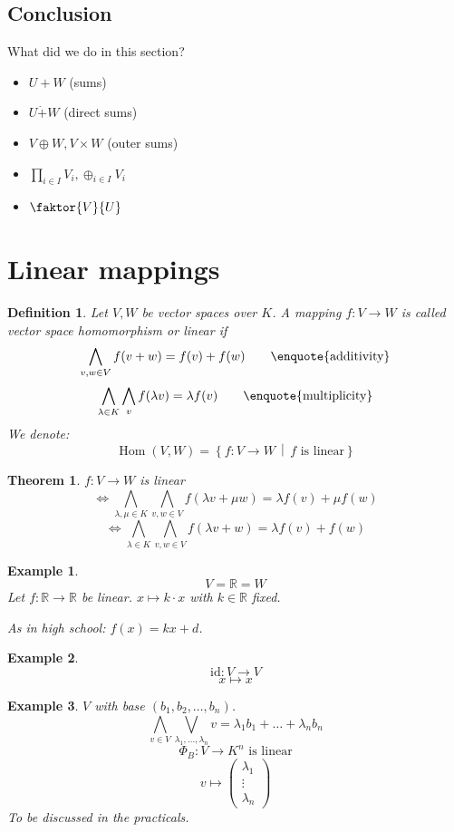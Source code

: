 \documentclass[a4paper,landscape,twocolumn]{article}
\newcommand\setdef[2]{\left\{#1\,\middle|\,#2\right\}}
\newtheorem{theorem}{Theorem}[section]
\newtheorem{defi}{Definition}[section]
\newtheorem{ex}{Example}[section]
\DeclareMathOperator\Hom{Hom} %
\begin{document}
\subsection{Conclusion}

What did we do in this section?
\begin{itemize}
  \item $U+W$ (sums)
  \item $U\dot{+}W$ (direct sums)
  \item $V\oplus W, V \times W$ (outer sums)
  \item $\prod_{i \in I} V_i, \oplus_{i \in I} V_i$
  \item $\faktor{V}{U}$
\end{itemize}

\section{Linear mappings}
\begin{defi}
  Let $V, W$ be vector spaces over $K$.
  A mapping $f: V \rightarrow W$ is called \emph{vector space homomorphism}
  or \emph{linear} if
  \[ \bigwedge_{v,w\in V} f(v+w) = f(v) + f(w) \qquad \text{\enquote{additivity}} \]
  \[ \bigwedge_{\lambda \in K} \bigwedge_{v} f(\lambda v) = \lambda f(v)  \qquad \text{\enquote{multiplicity}} \]
  We denote:
  \[ \Hom(V, W) = \setdef{f: V \rightarrow W}{f \text{ is linear}} \]
\end{defi}

\begin{theorem}
  \label{satz-5-2}
  $f: V \rightarrow W$ is linear
  \[ \iff \bigwedge_{\lambda,\mu \in K} \bigwedge_{v,w \in V} f(\lambda v + \mu w) = \lambda f(v) + \mu f(w) \]
  \[ \iff \bigwedge_{\lambda \in K} \bigwedge_{v,w \in V} f(\lambda v + w) = \lambda f(v) + f(w) \]
\end{theorem}

\begin{ex}
  \label{bsp-5-3}
  \[ V = \mathbb R = W \]
  Let $f: \mathbb R \rightarrow \mathbb R$ be linear.
  $x \mapsto k \cdot x$ with $k \in \mathbb R$ fixed.

  As in high school: $f(x) = kx + d$.
\end{ex}
\begin{ex}
  \[ \text{id}: V \rightarrow V \]
  \[ x \mapsto x \]
\end{ex}
\begin{ex}
  $V$ with base $(b_1, b_2, \dots, b_n)$.
  \[ \bigwedge_{v \in V} \bigvee_{\lambda_1, \dots, \lambda_n} v = \lambda_1 b_1  + \dots + \lambda_n b_n \]
  \[ \Phi_B: V \rightarrow K^n \text{ is linear} \]
  \[ v \mapsto \begin{pmatrix} \lambda_1 \\ \vdots \\ \lambda_n \end{pmatrix} \]
  To be discussed in the practicals.
\end{ex}
\end{document}
